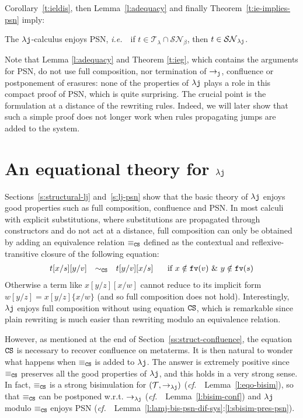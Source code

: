 \documentclass{LMCS}
\newcommand{\ie}{{\it  i.e.}~}
\newcommand{\cf}{{\it  cf.}~}
\renewcommand{\>}{\rightarrow}
\def\lam{\lambda}
\newcommand{\Rew}[1]{\rightarrow_{#1}}
\newcommand{\isubs}[1]{ \{ #1  \} }
\newcommand{\SN}[1]{\mathcal{SN}_{#1}}
\newcommand{\dis}{{\tt j}}
\newcommand{\ldis}{\lam{\dis}}
\newcommand{\lj}{\lam{\dis}}
\newcommand{\fv}[1]{{\tt fv}(#1)}
\newcommand{\CS}{{\tt CS}}
\newcommand{\terms}{\mathcal{T}}
\newcommand{\termslambda}{\terms_{\lam}}
\newcommand{\eqcs}{\equiv_\CS}
\begin{document}
Corollary~\ref{t:ieldis}, then Lemma~\ref{l:adequacy}
and finally  Theorem~\ref{t:ie-implies-psn} imply:

\begin{cor}[PSN for $\ldis$]
\label{coro:struct-psn-lj}
The $\lj$-calculus enjoys PSN, \ie\ if $t \in \termslambda \cap \SN{\beta}$, then $t \in \SN{\ldis}$.
\end{cor}

Note that Lemma \ref{l:adequacy} and Theorem \ref{t:ieg}, which
contains the arguments for PSN, do not use full composition, nor
termination of $\Rew{\dis}$, confluence or postponement of erasures:
none of the properties of $\lj$ plays a role in this compact proof of
PSN, which is quite surprising. The crucial point is the formulation
at a distance of the rewriting rules. Indeed, we will later show that
such a simple proof does not longer work when rules propagating jumps
are added to the system.

\section{An equational theory for $\ldis$}
\label{s:eq-th}
Sections~\ref{s:structural-lj} and~\ref{s:lj-psn} show  that the basic
theory of $\ldis$ enjoys good properties such as full composition,
confluence and PSN. In most calculi with explicit
substitutions, where substitutions are propagated through constructors
and do not act at a distance, full composition can only be obtained by
adding an equivalence relation $\eqcs$ defined as the contextual and
reflexive-transitive closure of the following equation:
\[ \begin{array}{lll@{\hspace{.5cm}}l}
   t[x/s][y/v] & \sim_{\CS} & t[y/v][x/s] & \mbox{ if } x\notin\fv{v}\ \&\ y\notin\fv{s}  \\
   \end{array} \] 
Otherwise  a term like $x[y/z][x/w]$ cannot reduce to its implicit form 
$w[y/z] = x[y/z]\isubs{x/w}$
(and so full
composition does not hold). Interestingly, $\ldis$ enjoys full
composition without using equation $\CS$, which is remarkable since 
plain
rewriting is much easier than rewriting
modulo an equivalence relation.\medskip

However, as mentioned at the end of
Section~\ref{ss:struct-confluence}, the equation $\CS$ is necessary to
recover confluence on metaterms.  It is then natural to wonder what
happens when $\eqcs$ is added to $\lj$. The answer is extremely
positive since $\eqcs$ preserves all the good properties of $\ldis$,
and this holds in a very strong sense. In fact, $\eqcs$ is a strong
bisimulation for $(\terms,\Rew{\lj})$ (\cf\ Lemma~\ref{l:eqo-bisim}),
so that $\eqcs$ can be postponed w.r.t. $\Rew{\lj}$
(\cf\ Lemma~\ref{l:bisim-conf})  and $\ldis$ modulo $\eqcs$ enjoys
  PSN
  (\cf\ Lemma~\ref{l:lamj-bis-psn-dif-sys}:\ref{l:sbisim-pres-psn}).
\end{document}
